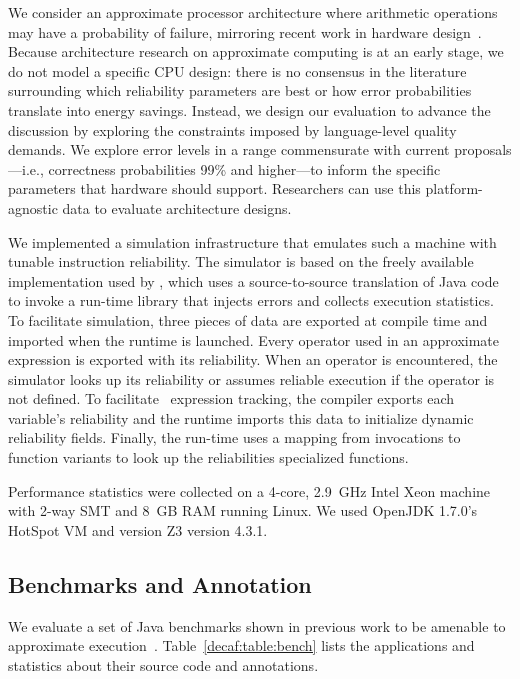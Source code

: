 {We consider an approximate processor architecture where arithmetic
operations may have a probability of failure, mirroring recent work in
hardware design~\cite{truffle, quora, kim-hpca, uva-adder}.
Because architecture research on approximate computing is at an early stage,
we do not model a specific CPU design: there is no consensus in the literature
surrounding which reliability parameters are best or how error probabilities
translate into energy savings.
Instead, we design our evaluation to advance the discussion by exploring the
constraints imposed by language-level quality demands.
We explore error levels in a range commensurate with current proposals---i.e.,
correctness probabilities 99\% and higher---to inform the specific parameters
that hardware should support.
Researchers can use this platform-agnostic data to evaluate architecture
designs.

We implemented a simulation
infrastructure that emulates such a machine with tunable instruction
reliability.  The
simulator is based on the freely available implementation used by
\citet{enerj}, which uses a
source-to-source translation of Java code to invoke a run-time library that
injects errors and collects execution statistics.  To facilitate simulation,
three pieces of data are exported at compile time and imported when the runtime
is launched.  Every operator used in an approximate expression is exported with
its reliability.  When an operator is encountered, the simulator looks up its
reliability or assumes reliable execution if the operator is not defined.
To facilitate \Dyn\ expression tracking, the compiler exports each variable's
reliability and the runtime imports this data to initialize dynamic
reliability fields.
Finally, the run-time uses a mapping from invocations to function
variants to look up the reliabilities specialized functions.

Performance statistics were collected on a 4-core, 2.9~GHz Intel Xeon machine
with 2-way SMT and 8~GB RAM running Linux.
We used OpenJDK 1.7.0's HotSpot VM and version Z3 version 4.3.1.

\subsection{Benchmarks and Annotation}

We evaluate a set of Java benchmarks shown in previous work to be amenable to
approximate execution~\cite{enerj, approxstorage}.
Table~\ref{decaf:table:bench} lists the applications and statistics about their
source code and annotations.

}
